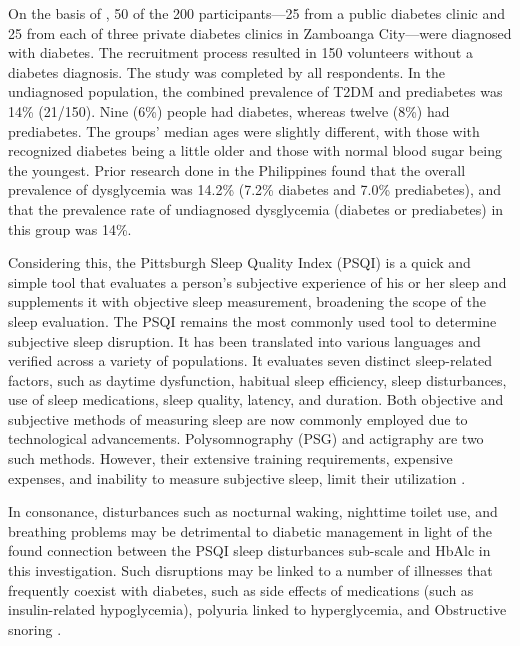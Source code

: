 On the basis of \textcite{agarwal-2019}, 50 of the 200 participants—25 from a
public diabetes clinic and 25 from each of three private diabetes clinics in
Zamboanga City—were diagnosed with diabetes. The recruitment process resulted in
150 volunteers without a diabetes diagnosis. The study was completed by all
respondents. In the undiagnosed population, the combined prevalence of T2DM and
prediabetes was 14\% (21/150). Nine (6\%) people had diabetes, whereas twelve
(8\%) had prediabetes. The groups' median ages were slightly different, with
those with recognized diabetes being a little older and those with normal blood
sugar being the youngest. Prior research done in the Philippines found that the
overall prevalence of dysglycemia was 14.2\% (7.2\% diabetes and 7.0\%
prediabetes), and that the prevalence rate of undiagnosed dysglycemia (diabetes
or prediabetes) in this group was 14\%.

Considering this, the Pittsburgh Sleep Quality Index (PSQI) is a quick and
simple tool that evaluates a person's subjective experience of his or her sleep
and supplements it with objective sleep measurement, broadening the scope of the
sleep evaluation. The PSQI remains the most commonly used tool to determine
subjective sleep disruption. It has been translated into various languages and
verified across a variety of populations. It evaluates seven distinct
sleep-related factors, such as daytime dysfunction, habitual sleep efficiency,
sleep disturbances, use of sleep medications, sleep quality, latency, and
duration. Both objective and subjective methods of measuring sleep are now
commonly employed due to technological advancements. Polysomnography (PSG) and
actigraphy are two such methods. However, their extensive training requirements,
expensive expenses, and inability to measure subjective sleep, limit their
utilization \parencite{zhu-2018}.

In consonance, disturbances such as nocturnal waking, nighttime toilet use, and
breathing problems may be detrimental to diabetic management in light of the
found connection between the PSQI sleep disturbances sub-scale and HbAlc in this
investigation. Such disruptions may be linked to a number of illnesses that
frequently coexist with diabetes, such as side effects of medications (such as
insulin-related hypoglycemia), polyuria linked to hyperglycemia, and Obstructive
snoring \parencite{telford-2018}.

